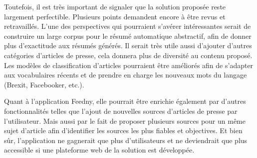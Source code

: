 Toutefois, il est très important de signaler que la solution proposée reste largement perfectible. Plusieurs points demandent encore à être revus et retravaillés. L'une des perspectives qui pourraient s'avérer intéressantes serait de construire un large corpus pour le résumé automatique abstractif, afin de donner plus d'exactitude aux résumés générés. Il serait très utile aussi d'ajouter d'autres catégories d'articles de presse, cela donnera plus de diversité au contenu proposé. Les modèles de classification d'articles pourraient être améliorés afin de s'adapter aux vocabulaires récents et de prendre en charge les nouveaux mots du langage (Brexit, Facebooker, etc.).

Quant à l'application \textquotedbl Feedny\textquotedbl, elle pourrait être enrichie également par d'autres fonctionnalités telles que l'ajout de nouvelles sources d'articles de presse par l'utilisateur. Mais aussi par le fait de proposer plusieurs sources pour un même sujet d'article afin d'identifier les sources les plus fiables et objectives.
Et bien sûr, l’application ne gagnerait que plus d’utilisateurs et ne deviendrait que plus accessible si une plateforme web de la solution est développée.